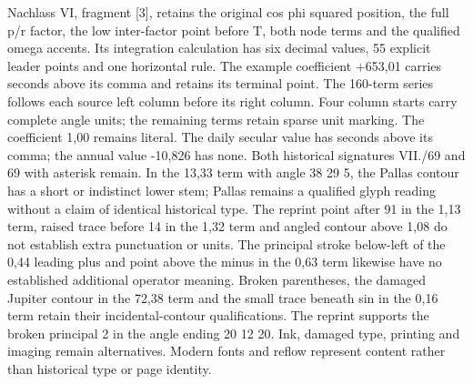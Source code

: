 Nachlass VI, fragment [3], retains the original cos phi squared position, the full p/r factor, the low inter-factor point before T, both node terms and the qualified omega accents. Its integration calculation has six decimal values, 55 explicit leader points and one horizontal rule. The example coefficient +653,01 carries seconds above its comma and retains its terminal point. The 160-term series follows each source left column before its right column. Four column starts carry complete angle units; the remaining terms retain sparse unit marking. The coefficient 1,00 remains literal. The daily secular value has seconds above its comma; the annual value -10,826 has none. Both historical signatures VII./69 and 69 with asterisk remain. In the 13,33 term with angle 38 29 5, the Pallas contour has a short or indistinct lower stem; Pallas remains a qualified glyph reading without a claim of identical historical type. The reprint point after 91 in the 1,13 term, raised trace before 14 in the 1,32 term and angled contour above 1,08 do not establish extra punctuation or units. The principal stroke below-left of the 0,44 leading plus and point above the minus in the 0,63 term likewise have no established additional operator meaning. Broken parentheses, the damaged Jupiter contour in the 72,38 term and the small trace beneath sin in the 0,16 term retain their incidental-contour qualifications. The reprint supports the broken principal 2 in the angle ending 20 12 20. Ink, damaged type, printing and imaging remain alternatives. Modern fonts and reflow represent content rather than historical type or page identity.


